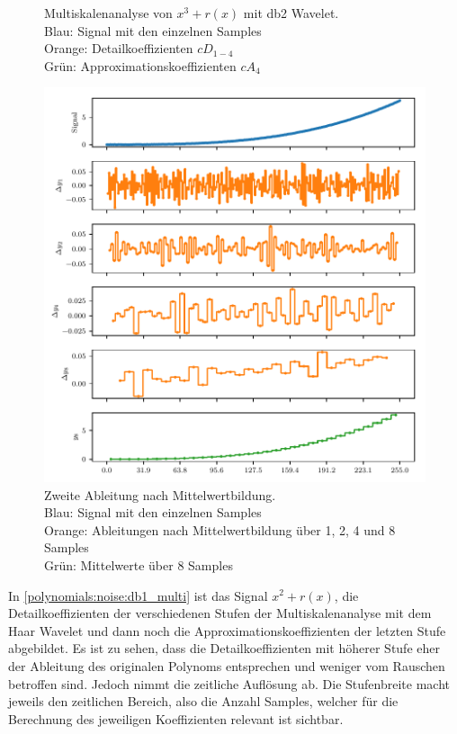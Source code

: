 \begin{refsection}
\begin{figure}
\caption{Multiskalenanalyse von $x^3 + r(x)$ mit db2 Wavelet. \\
Blau: Signal mit den einzelnen Samples\\
Orange: Detailkoeffizienten $cD_{1-4}$ \\
Grün: Approximationskoeffizienten $cA_4$\label{polynomials:noise:db2_multi}}
\end{figure}
\begin{figure}
\centering
\includegraphics{papers/polynomials/images/polynomials_noise_moving_average_2nd.pdf}
\caption{Zweite Ableitung nach Mittelwertbildung.\\
Blau: Signal mit den einzelnen Samples\\
Orange: Ableitungen nach Mittelwertbildung über 1, 2, 4 und 8 Samples\\
Grün: Mittelwerte über 8 Samples\label{polynomials:noise:average2nd}}
\end{figure}
In \cref{polynomials:noise:db1_multi} ist das Signal $x^2 + r(x)$, die
Detailkoeffizienten der verschiedenen Stufen der Multiskalenanalyse mit dem
Haar Wavelet und dann noch die Approximationskoeffizienten der letzten Stufe
abgebildet. Es ist zu sehen, dass die Detailkoeffizienten mit höherer Stufe
eher der Ableitung des originalen Polynoms entsprechen und weniger vom Rauschen
betroffen sind. Jedoch nimmt die zeitliche Auflösung ab.
Die Stufenbreite macht jeweils den zeitlichen Bereich, also die Anzahl Samples,
welcher für die Berechnung des jeweiligen Koeffizienten relevant ist sichtbar.


\end{refsection}
